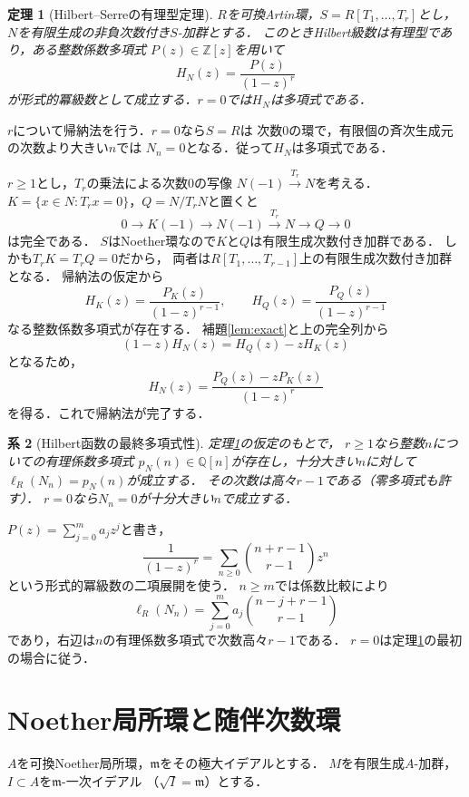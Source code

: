 \documentclass[a5paper,10pt,onecolumn]{jsarticle}
\makeatletter
\theoremstyle{mathnotetheorem}
\newtheorem{theorem}{定理}[section]
\newtheorem{corollary}[theorem]{系}
\renewcommand{\proofname}{証明}
\renewenvironment{proof}[1][\proofname]{%
  \par\pushQED{\qed}\normalfont\topsep4\p@\@plus2\p@\relax
  \trivlist\item[\hskip\labelsep\bfseries #1]\ignorespaces
}{\popQED\endtrivlist\@endpefalse}
\makeatother
\begin{document}
\begin{theorem}[Hilbert--Serreの有理型定理]\label{thm:HS}
$R$を可換Artin環，$S=R[T_1,\ldots,T_r]$とし，
$N$を有限生成の非負次数付き$S$-加群とする．
このときHilbert級数は有理型であり，ある整数係数多項式
$P(z)\in\mathbb Z[z]$を用いて
\[
 H_N(z)=\frac{P(z)}{(1-z)^r}
\]
が形式的冪級数として成立する．$r=0$では$H_N$は多項式である．
\end{theorem}
\begin{proof}
$r$について帰納法を行う．$r=0$なら$S=R$は
次数0の環で，有限個の斉次生成元の次数より大きい$n$では
$N_n=0$となる．従って$H_N$は多項式である．

$r\ge1$とし，$T_r$の乗法による次数0の写像
$N(-1)\xrightarrow{T_r}N$を考える．
$K=\{x\in N:T_rx=0\}$，$Q=N/T_rN$と置くと
\[
 0\longrightarrow K(-1)\longrightarrow N(-1)
 \xrightarrow{T_r}N\longrightarrow Q\longrightarrow0
\]
は完全である．
$S$はNoether環なので$K$と$Q$は有限生成次数付き加群である．
しかも$T_rK=T_rQ=0$だから，
両者は$R[T_1,\ldots,T_{r-1}]$上の有限生成次数付き加群となる．
帰納法の仮定から
\[
 H_K(z)=\frac{P_K(z)}{(1-z)^{r-1}},\qquad
 H_Q(z)=\frac{P_Q(z)}{(1-z)^{r-1}}
\]
なる整数係数多項式が存在する．
補題\ref{lem:exact}と上の完全列から
\[
 (1-z)H_N(z)=H_Q(z)-zH_K(z)
\]
となるため，
\[
 H_N(z)=\frac{P_Q(z)-zP_K(z)}{(1-z)^r}
\]
を得る．これで帰納法が完了する．
\end{proof}

\begin{corollary}[Hilbert函数の最終多項式性]\label{cor:eventual}
定理\ref{thm:HS}の仮定のもとで，
$r\ge1$なら整数$n$についての有理係数多項式
$p_N(n)\in\mathbb Q[n]$が存在し，十分大きい$n$に対して
$\ell_R(N_n)=p_N(n)$が成立する．
その次数は高々$r-1$である（零多項式も許す）．
$r=0$なら$N_n=0$が十分大きい$n$で成立する．
\end{corollary}
\begin{proof}
$P(z)=\sum_{j=0}^m a_jz^j$と書き，
\[
 \frac1{(1-z)^r}
 =\sum_{n\ge0}\binom{n+r-1}{r-1}z^n
\]
という形式的冪級数の二項展開を使う．
$n\ge m$では係数比較により
\[
 \ell_R(N_n)=\sum_{j=0}^m
 a_j\binom{n-j+r-1}{r-1}
\]
であり，右辺は$n$の有理係数多項式で次数高々$r-1$である．
$r=0$は定理\ref{thm:HS}の最初の場合に従う．
\end{proof}

\section{Noether局所環と随伴次数環}
$A$を可換Noether局所環，$\mathfrak m$をその極大イデアルとする．
$M$を有限生成$A$-加群，$I\subset A$を$\mathfrak m$-一次イデアル
（$\sqrt I=\mathfrak m$）とする．
\end{document}
